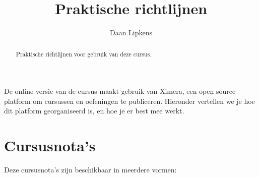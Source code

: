 \documentclass{ximera}
\title{Praktische richtlijnen}
\author{Daan Lipkens}
\begin{document}
\begin{abstract}
    Praktische richtlijnen voor gebruik van deze cursus.
\end{abstract}
\maketitle

De online versie van de cursus maakt gebruik van Ximera, een open source platform om cursussen en oefeningen te publiceren. Hieronder vertellen we je hoe dit platform georganiseerd is, en hoe je er best mee werkt.

\section*{Cursusnota's}
Deze cursusnota's zijn beschikbaar in meerdere vormen:
\end{document}
